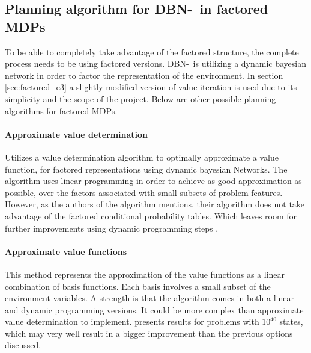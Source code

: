 \subsection{Planning algorithm for DBN-\etre\ in factored MDPs}
\label{sec:better_planing_algos}

To be able to completely take advantage of the factored structure, the complete
process needs to be using factored versions. DBN-\etre\ is utilizing a dynamic
bayesian network in order to factor the representation of the environment. In
section \ref{sec:factored_e3} a slightly modified version of value iteration is
used due to its simplicity and the scope of the project. Below are other
possible planning algorithms for factored MDPs.

\paragraph{Approximate value determination}

Utilizes a value determination algorithm to optimally approximate a value
function, for factored representations using dynamic bayesian Networks. The
algorithm uses linear programming in order to achieve as good approximation
as possible, over the factors associated with small subsets of problem
features. However, as the authors of the algorithm mentions, their algorithm
does not take advantage of the factored conditional probability tables. Which
leaves room for further improvements using dynamic programming steps
\parencite{koller1999computing}.

\paragraph{Approximate value functions}

This method represents the approximation of the value functions as a linear
combination of basis functions. Each basis involves a small subset of the
environment variables. A strength is that the algorithm comes in both a linear
and dynamic programming versions. It could be more complex than approximate
value determination to implement. \textcite{guestrin2003efficient} presents
results for problems with $10^{40}$ states, which may very well result in a
bigger improvement than the previous options discussed.
